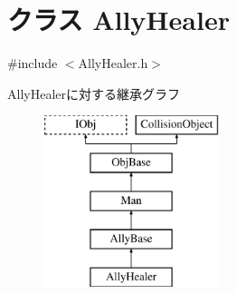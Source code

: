 \hypertarget{class_ally_healer}{\section{クラス Ally\-Healer}
\label{class_ally_healer}
}


{\ttfamily \#include $<$Ally\-Healer.\-h$>$}

Ally\-Healerに対する継承グラフ\begin{figure}[H]
\begin{center}
\leavevmode
\includegraphics[height=5.000000cm]{df/d69/class_ally_healer}
\end{center}
\end{figure}
